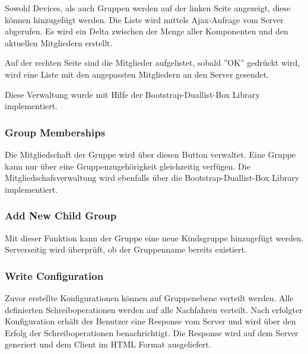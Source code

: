 Sowohl Devices, als auch Gruppen werden auf der linken Seite angezeigt, diese können hinzugefügt werden. Die Liste wird mittels Ajax-Anfrage vom Server abgerufen. Es wird ein Delta zwischen der Menge aller Komponenten und den aktuellen Mitgliedern erstellt.

Auf der rechten Seite sind die Mitglieder aufgelistet, sobald ''OK'' gedrückt wird, wird eine Liste mit den angepassten Mitgliedern an den Server gesendet.

Diese Verwaltung wurde mit Hilfe der Bootstrap-Duallist-Box Library implementiert. 
\subsubsection{Group Memberships}
Die Mitgliedschaft der Gruppe wird über diesen Button verwaltet. Eine Gruppe kann nur über eine Gruppenzugehörigkeit gleichzeitig verfügen. Die Mitgliedschafsverwaltung wird ebenfalls über die Bootstrap-Duallist-Box Library implementiert.

\subsubsection{Add New Child Group}
Mit dieser Funktion kann der Gruppe eine neue Kindsgruppe hinzugefügt werden. Serverseitig wird überprüft, ob der Gruppenname bereits existiert.
\subsubsection{Write Configuration}
Zuvor erstellte Konfigurationen können auf Gruppenebene verteilt werden. Alle definierten Schreiboperationen werden auf alle Nachfahren verteilt. Nach erfolgter Konfiguration erhält der Benutzer eine Response vom Server und wird über den Erfolg der Schreiboperationen benachrichtigt. Die Response wird auf dem Server generiert und dem Client im HTML Format ausgeliefert.

